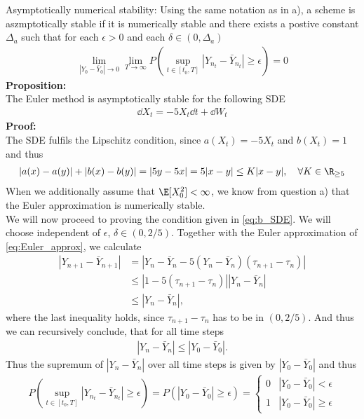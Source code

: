 Asymptotically numerical stability: Using the same notation as in a), a scheme is aszmptotically stable if it is numerically stable and there exists a postive constant $\Delta_a$ such that for each $\epsilon>0$ and each $\delta\in(0,\Delta_a)$
\begin{align}
\lim_{|Y_0-\bar{Y}_0|\rightarrow 0}\lim_{T\rightarrow \infty} P\left(\sup_{t\in[t_0,T]}|Y_{n_t}-\bar{Y}_{n_t}|\geq \epsilon\right) =0 \label{eq:b_as_stab_cond}
\end{align}
\textbf{Proposition:} \\
The Euler method is asymptotically stable for the following SDE
\begin{align}
\dd X_t = -5 X_t \dd t +\dd W_t \label{eq:b_SDE}
\end{align}
\textbf{Proof:}\\
The SDE fulfils the Lipschitz condition, since $a(X_t) = -5X_t$ and $b(X_t)=1$ and thus
\begin{align}
|a(x)-a(y)|+|b(x)-b(y)| = |5y-5x| = 5 |x-y|\leq K |x-y|, \quad \forall K \in \R_{\geq 5}
\end{align}
When we additionally assume that $\E[X_0^2]<\infty$, we know from question a) that the Euler approximation is numerically stable.\\ 
We will now proceed to proving the condition given in \cref{eq:b_SDE}. We will choose independent of $\epsilon$, $\delta \in (0,2/5)$.
Together with the Euler approximation of \cref{eq:Euler_approx}, we calculate
\begin{align}
|Y_{n+1}-\bar{Y}_{n+1}| &= |Y_n-\bar{Y}_n-5(Y_n-\bar{Y}_n)(\tau_{n+1}-\tau_n)|\\
&\leq |1-5(\tau_{n+1}-\tau_n)||Y_n-\bar{Y}_n|\\
&\leq |Y_n-\bar{Y}_n|,
\end{align}
where the last inequality holds, since $\tau_{n+1}-\tau_n$ has to be in $(0,2/5)$. And thus we can recursively conclude, that for all time steps
\begin{align}
|Y_n-\bar{Y}_n|\leq |Y_0-\bar{Y}_0|.
\end{align}
Thus the supremum of $|Y_n-\bar{Y}_n|$  over all time steps is given by $|Y_0-\bar{Y}_0|$ and thus
\begin{align}
 P\left(\sup_{t\in[t_0,T]}|Y_{n_t}-\bar{Y}_{n_t}|\geq \epsilon\right)  =  P\left(|Y_{0}-\bar{Y}_{0}|\geq \epsilon\right)
 = \begin{cases} 
      0 &  |Y_{0}-\bar{Y}_{0}| < \epsilon\\
     1& |Y_{0}-\bar{Y}_{0}|\geq \epsilon
   \end{cases}
\end{align}
